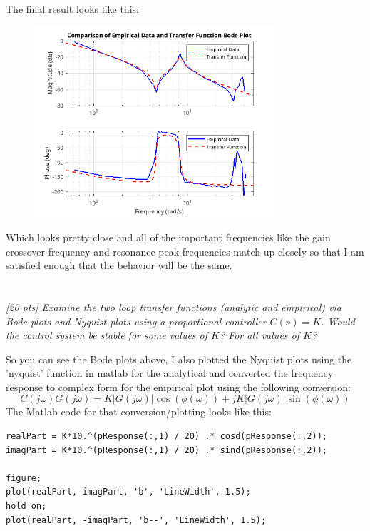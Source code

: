 \documentclass{article}
\begin{document}
The final result looks like this:

\begin{figure}[H]
    \centering
    \includegraphics[width=0.8\textwidth]{analyticTFbode.png}
    \label{fig:analyticTFbode}
\end{figure}

Which looks pretty close and all of the important frequencies like the gain crossover frequency and resonance peak frequencies match up closely so that I am satisfied enough that the behavior will be the same.

\section{}

\textit{[20 pts] Examine the two loop transfer functions (analytic and empirical) via Bode plots and Nyquist plots using a proportional controller \(C(s) = K\). Would the control system be stable for some values of \(K\)? For all values of \(K\)?}

So you can see the Bode plots above, I also plotted the Nyquist plots using the 'nyquist' function in matlab for the analytical and converted the frequency response to complex form for the empirical plot using the following conversion: 
\[C(j\omega)G(j\omega) = K |G(j\omega)| \cos(\phi(\omega)) + j K |G(j\omega)| \sin(\phi(\omega))\]
The Matlab code for that conversion/plotting looks like this:

\begin{lstlisting}[style=matlabstyle]
realPart = K*10.^(pResponse(:,1) / 20) .* cosd(pResponse(:,2));
imagPart = K*10.^(pResponse(:,1) / 20) .* sind(pResponse(:,2));

figure;
plot(realPart, imagPart, 'b', 'LineWidth', 1.5);
hold on;
plot(realPart, -imagPart, 'b--', 'LineWidth', 1.5);
\end{lstlisting}
\end{document}
